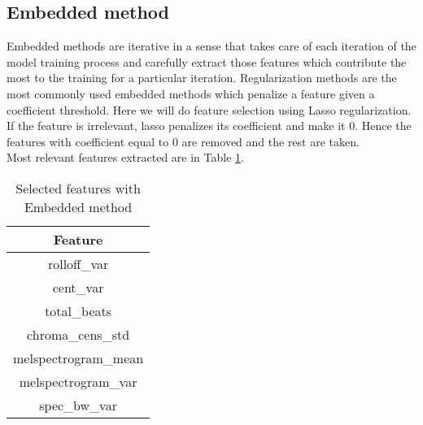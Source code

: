 \subsection{Embedded method}
Embedded methods are iterative in a sense that takes care of each iteration of the model training process and carefully extract those features which contribute the most to the training for a particular iteration. Regularization methods are the most commonly used embedded methods which penalize a feature given a coefficient threshold.
Here we will do feature selection using Lasso regularization. If the feature is irrelevant, lasso penalizes its coefficient and make it $0$. Hence the features with coefficient equal to $0$ are removed and the rest are taken.
\\
Most relevant features extracted are in Table \ref{table:embedded_features}.
\begin{table}[h!]
	\centering
	\begin{tabular}{|c|}
		\hline
		Feature\\ [0.5ex] 
		\hline\hline rolloff\_var \\
		\hline cent\_var \\
		\hline total\_beats \\
		\hline chroma\_cens\_std \\
		\hline melspectrogram\_mean \\
		\hline melspectrogram\_var\\
		\hline spec\_bw\_var \\
		\hline
	\end{tabular}
	\caption{Selected features with Embedded method}
	\label{table:embedded_features}
\end{table}

